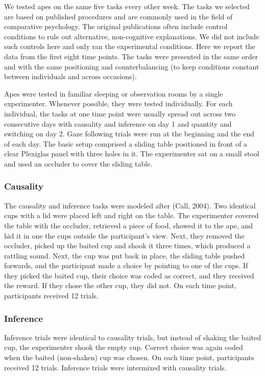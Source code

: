 \documentclass[10pt, letterpaper]{article}
\begin{document}
We tested apes on the same five tasks every other week. The tasks we
selected are based on published procedures and are commonly used in the
field of comparative psychology. The original publications often include
control conditions to rule out alternative, non-cognitive explanations.
We did not include such controls here and only ran the experimental
conditions. Here we report the data from the first eight time points.
The tasks were presented in the same order and with the same positioning
and counterbalancing (to keep conditions constant between individuals
and across occasions).

Apes were tested in familiar sleeping or observation rooms by a single
experimenter. Whenever possible, they were tested individually. For each
individual, the tasks at one time point were usually spread out across
two consecutive days with causality and inference on day 1 and quantity
and switching on day 2. Gaze following trials were run at the beginning
and the end of each day. The basic setup comprised a sliding table
positioned in front of a clear Plexiglas panel with three holes in it.
The experimenter sat on a small stool and used an occluder to cover the
sliding table.

\hypertarget{causality}{%
\subsubsection{Causality}\label{causality}}

The causality and inference tasks were modeled after (Call, 2004). Two
identical cups with a lid were placed left and right on the table. The
experimenter covered the table with the occluder, retrieved a piece of
food, showed it to the ape, and hid it in one the cups outside the
participant's view. Next, they removed the occluder, picked up the
baited cup and shook it three times, which produced a rattling sound.
Next, the cup was put back in place, the sliding table pushed forwards,
and the participant made a choice by pointing to one of the cups. If
they picked the baited cup, their choice was coded as correct, and they
received the reward. If they chose the other cup, they did not. On each
time point, participants received 12 trials.

\hypertarget{inference}{%
\subsubsection{Inference}\label{inference}}

Inference trials were identical to causality trials, but instead of
shaking the baited cup, the experimenter shook the empty cup. Correct
choice was again coded when the baited (non-shaken) cup was chosen. On
each time point, participants received 12 trials. Inference trials were
intermixed with causality trials.
\end{document}
